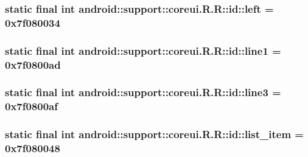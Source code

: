 \hypertarget{classandroid_1_1support_1_1coreui_1_1_r_1_1id_2ce382a610ff2c6b45960fd9140f7714}{
\subsubsection[{left}]{\setlength{\rightskip}{0pt plus 5cm}static final int android::support::coreui.R.R::id::left = 0x7f080034}}
\label{classandroid_1_1support_1_1coreui_1_1_r_1_1id_2ce382a610ff2c6b45960fd9140f7714}


\hypertarget{classandroid_1_1support_1_1coreui_1_1_r_1_1id_9a522f729aca70a285a6d45f653de7b9}{
\subsubsection[{line1}]{\setlength{\rightskip}{0pt plus 5cm}static final int android::support::coreui.R.R::id::line1 = 0x7f0800ad}}
\label{classandroid_1_1support_1_1coreui_1_1_r_1_1id_9a522f729aca70a285a6d45f653de7b9}


\hypertarget{classandroid_1_1support_1_1coreui_1_1_r_1_1id_0882a1138d641baea8227915a10c56d2}{
\subsubsection[{line3}]{\setlength{\rightskip}{0pt plus 5cm}static final int android::support::coreui.R.R::id::line3 = 0x7f0800af}}
\label{classandroid_1_1support_1_1coreui_1_1_r_1_1id_0882a1138d641baea8227915a10c56d2}


\hypertarget{classandroid_1_1support_1_1coreui_1_1_r_1_1id_efb38c2d5e5a500964046b57c1bc1165}{
\subsubsection[{list\_\-item}]{\setlength{\rightskip}{0pt plus 5cm}static final int android::support::coreui.R.R::id::list\_\-item = 0x7f080048}}
\label{classandroid_1_1support_1_1coreui_1_1_r_1_1id_efb38c2d5e5a500964046b57c1bc1165}



